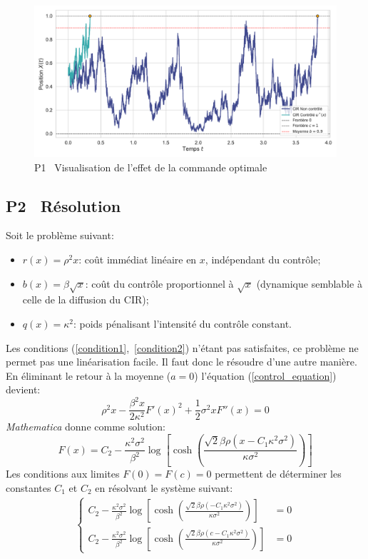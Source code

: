 \begin{figure}[htb]
    \centering
    \includegraphics[width=0.9\linewidth]{img/validation/P1/p1_control_simulation.pdf}
    \caption{P1 \textemdash~Visualisation de l'effet de la commande optimale}\label{fig:Simulation1}
\end{figure}\FloatBarrier\pagebreak\subsection{P2 \textemdash~Résolution}\label{p2}
Soit le problème suivant:
\begin{itemize}
    \item $r(x) = \rho^2x$: coût immédiat linéaire en $x$, indépendant du contrôle;
    \item $b(x) = \beta\sqrt{x}$: coût du contrôle proportionnel à $\sqrt{x}$ (dynamique semblable à celle de la diffusion du \acs{CIR});
    \item $q(x) = \kappa^2$: poids pénalisant l'intensité du contrôle constant.
\end{itemize}
Les conditions (\ref{condition1},~\ref{condition2}) n'étant pas satisfaites, ce problème ne permet pas une linéarisation facile. Il faut donc le résoudre d'une autre manière. En éliminant le retour à la moyenne ($a=0$) l'équation (\ref{control_equation}) devient:
\[
\rho^2x-\frac{\beta^2x}{2\kappa^2}{F'(x)}^2+\frac{1}{2}\sigma^2xF''(x)=0
\]
\textit{Mathematica} donne comme solution:
\begin{equation}\label{sol_control_2}
    F(x)=C_2-\frac{\kappa ^2 \sigma ^2 }{\beta ^2}\log \left[\cosh \left(\frac{\sqrt{2} \beta  \rho  \left(x-C_1 \kappa ^2 \sigma ^2\right)}{\kappa  \sigma ^2}\right)\right]
\end{equation}
Les conditions aux limites $F(0)=F(c)=0$ permettent de déterminer les constantes $C_1$ et $C_2$ en résolvant le système suivant:
\begin{align*}
\left\{\begin{aligned}
    C_2-\frac{\kappa ^2 \sigma ^2 }{\beta ^2}\log \left[\cosh \left(\frac{\sqrt{2} \beta  \rho  \left(-C_1 \kappa ^2 \sigma ^2\right)}{\kappa  \sigma ^2}\right)\right]&=0\\
    C_2-\frac{\kappa ^2 \sigma ^2 }{\beta ^2}\log \left[\cosh \left(\frac{\sqrt{2} \beta  \rho  \left(c-C_1 \kappa ^2 \sigma ^2\right)}{\kappa  \sigma ^2}\right)\right]&=0
\end{aligned}\right.
\end{align*}
